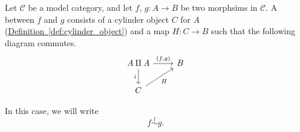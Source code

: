 \documentclass[main.tex]{subfiles}
\begin{document}
\begin{definition}
  \label{def:left_homotopy}
  Let $\mathcal{C}$ be a model category, and let $f$, $g\colon A \to B$ be two morphsims in $\mathcal{C}$. A  between $f$ and $g$ consists of a cylinder object $C$ for $A$ (\hyperref[def:cylinder_object]{Definition~\ref*{def:cylinder_object}}) and a map $H\colon C \to B$ such that the following diagram commutes.
  \begin{equation*}
    \begin{tikzcd}
      A \amalg A
      \arrow[d, swap, "i"]
      \arrow[r, "{(f, g)}"]
      & B
      \\
      C
      \arrow[ur, swap, "H"]
    \end{tikzcd}
  \end{equation*}

  In this case, we will write
  \begin{equation*}
    f \overset{l}{\sim} g.
  \end{equation*}
\end{definition}
\end{document}
